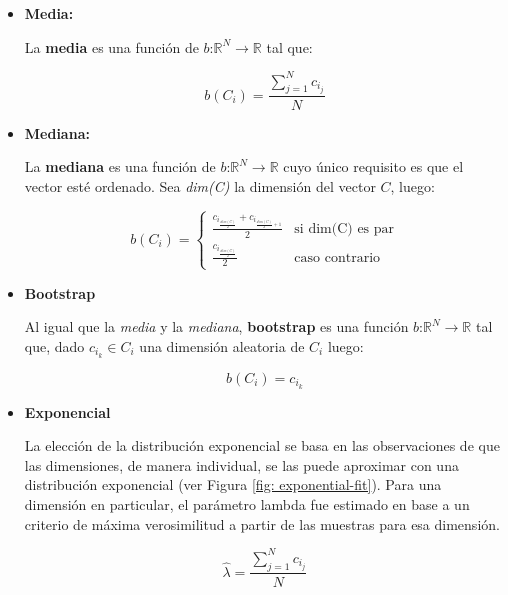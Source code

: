 	\begin{itemize}
	
	\item \textbf{Media:}
	
	La \textbf{media} es una función de $\textit{b:}\mathbb{R}^{N} \rightarrow \mathbb{R}$ tal que:
	
	$$b(C_i) = \frac{\sum_{j=1}^N c_{i_j}}{N} $$

	\item \textbf{Mediana:}
	
	La \textbf{mediana} es una función de $\textit{b:}\mathbb{R}^{N} \rightarrow \mathbb{R}$ cuyo único requisito es que el vector esté ordenado. Sea \textit{dim(C)} la dimensión del vector $C$, luego:
	
	\[
    		b(C_i) = 
		\begin{cases}
    			\frac{c_{i_{\frac{dim(C)}{2}}} + c_{i_{\frac{dim(C)}{2}+1}}}{2} & \text{si dim(C) es par}\\
    			\frac{c_{i_{\frac{dim(C)}{2}}}}{2} & \text{caso contrario}
		\end{cases}
	\]
	
	\item \textbf{Bootstrap}
	
	Al igual que la \textit{media} y la \textit{mediana}, \textbf{bootstrap} es una función $\textit{b:}\mathbb{R}^{N} \rightarrow \mathbb{R}$ tal que, dado $c_{i_k} \in C_{i}$ una dimensión aleatoria de $C_{i}$ luego:
	
	$$ b(C_i) = c_{i_k} $$

	\item \textbf{Exponencial}
	
	La elección de la distribución exponencial se basa en las observaciones de que las dimensiones, de manera individual, se las puede aproximar con una distribución exponencial (ver Figura \ref{fig: exponential-fit}). Para una dimensión en particular, el parámetro lambda fue estimado en base a un criterio de máxima verosimilitud a partir de las muestras para esa dimensión.
	
	$$\hat{\lambda} = \frac{\sum_{j=1}^N c_{i_j}}{N} $$
	

\end{itemize}
